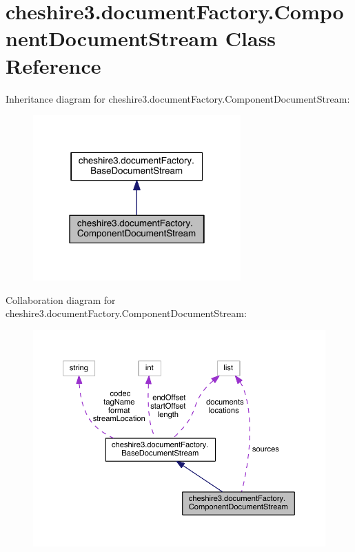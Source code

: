 \hypertarget{classcheshire3_1_1document_factory_1_1_component_document_stream}{\section{cheshire3.\-document\-Factory.\-Component\-Document\-Stream Class Reference}
\label{classcheshire3_1_1document_factory_1_1_component_document_stream}
}


Inheritance diagram for cheshire3.\-document\-Factory.\-Component\-Document\-Stream\-:
\nopagebreak
\begin{figure}[H]
\begin{center}
\leavevmode
\includegraphics[width=226pt]{classcheshire3_1_1document_factory_1_1_component_document_stream__inherit__graph}
\end{center}
\end{figure}


Collaboration diagram for cheshire3.\-document\-Factory.\-Component\-Document\-Stream\-:
\nopagebreak
\begin{figure}[H]
\begin{center}
\leavevmode
\includegraphics[width=350pt]{classcheshire3_1_1document_factory_1_1_component_document_stream__coll__graph}
\end{center}
\end{figure}
